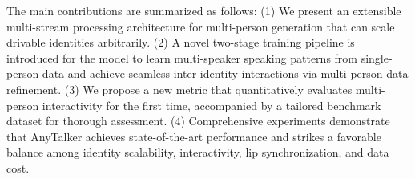 The main contributions are summarized as follows:
(1) We present an extensible multi-stream processing architecture for multi-person generation that can scale drivable identities arbitrarily.
(2) A novel two-stage training pipeline is introduced for the model to learn multi-speaker speaking patterns from single-person data and achieve seamless inter-identity interactions via multi-person data refinement.
(3) We propose a new metric that quantitatively evaluates multi-person interactivity for the first time, accompanied by a tailored benchmark dataset for thorough assessment.
(4) Comprehensive experiments demonstrate that AnyTalker achieves state-of-the-art performance and strikes a favorable balance among identity scalability, interactivity, lip synchronization, and data cost.
